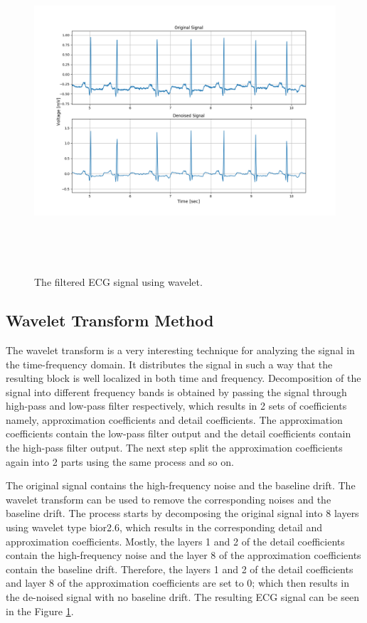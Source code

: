 \begin{figure}[h]
	\centering
	\includegraphics[width=15cm,height=12cm,keepaspectratio=true]{images/wavelet_denoised_1}
	\caption{
		The filtered ECG signal using wavelet.
	}
	\label{fig:wavelet_denoised}
\end{figure}


\subsection{Wavelet Transform Method}

The wavelet transform is a very interesting technique for analyzing the signal in the time-frequency domain. It distributes the signal in such a way that the resulting block is well localized in both time and frequency. Decomposition of the signal into different frequency bands is obtained by passing the signal through high-pass and low-pass filter respectively, which results in 2 sets of coefficients namely, approximation coefficients and detail coefficients. The approximation coefficients contain the low-pass filter output and the detail coefficients contain the high-pass filter output. The next step split the approximation coefficients again into 2 parts using the same process and so on.

The original signal contains the high-frequency noise and the baseline drift. The wavelet transform can be used to remove the corresponding noises and the baseline drift. The process starts by decomposing the original signal into 8 layers using wavelet type bior2.6, which results in the corresponding detail and approximation coefficients. Mostly, the layers 1 and 2 of the detail coefficients contain the high-frequency noise and the layer 8 of the approximation coefficients contain the baseline drift. Therefore, the layers 1 and 2 of the detail coefficients and layer 8 of the approximation coefficients are set to 0; which then results in the de-noised signal with no baseline drift. The resulting ECG signal can be seen in the Figure \ref{fig:wavelet_denoised}. 




